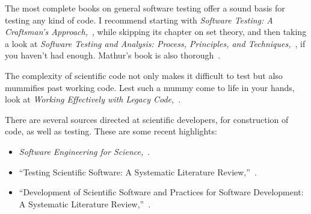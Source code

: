 \documentclass[fleqn,10pt]{olplainarticle}
\begin{document}
The most complete books on general software testing offer a sound
basis for testing any kind of code. I recommend starting with
\emph{Software Testing: A Craftsman's Approach,}~\citep{jorgensen2013},
while skipping its chapter on set theory, and then taking a look at
\emph{Software Testing and Analysis: Process, Principles, and Techniques,}~\citep{pezze2008},
if you haven't had enough. Mathur's book is also thorough~\citep{mathur2013}.

The complexity of scientific code not only makes it difficult
to test but also mummifies past working code. Lest such a mummy
come to life in your hands, look at \emph{Working Effectively with Legacy Code,}~\citep{feathers2004working}.

There are several sources directed at scientific developers, for
construction of code, as well as testing. These are some recent highlights:
\begin{itemize}
	\item \emph{Software Engineering for Science,}~\cite{carver2017}.
	\item ``Testing Scientific Software: A Systematic Literature Review,''~\cite{kanewala2014}.
	\item ``Development of Scientific Software and Practices for Software Development: A Systematic Literature Review,''~\cite{neumann2016}.
\end{itemize}




\printindex
\end{document}
